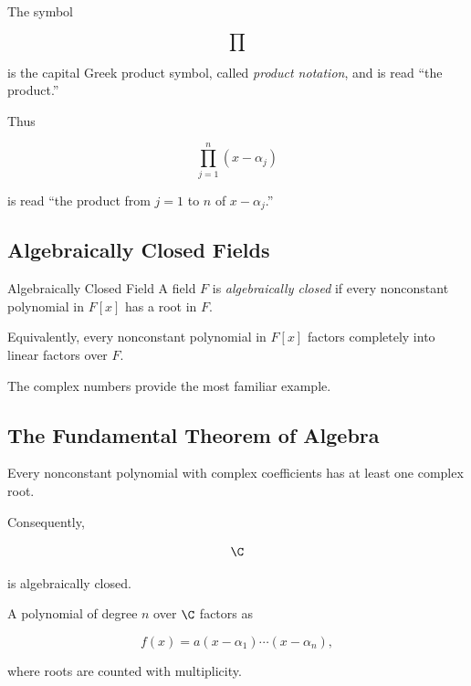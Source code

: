 The symbol

\[ \prod \]

is the capital Greek product symbol, called \emph{product notation}, and is
read ``the product.''

Thus

\[ \prod_{j=1}^{n}(x-\alpha_j) \]

is read ``the product from \(j=1\) to \(n\) of \(x-\alpha_j\).''

\subsection{Algebraically Closed Fields}
\label{subsec:algebraically-closed-fields}

\begin{definitionbox}{Algebraically Closed Field}
A field \(F\) is \emph{algebraically closed} if every nonconstant polynomial
in \(F[x]\) has a root in \(F\).
\end{definitionbox}

Equivalently, every nonconstant polynomial in \(F[x]\) factors completely
into linear factors over \(F\).

The complex numbers provide the most familiar example.

\subsection{The Fundamental Theorem of Algebra}
\label{subsec:fundamental-theorem-algebra-field}

\begin{theorem}
Every nonconstant polynomial with complex coefficients has at least one
complex root.
\end{theorem}

Consequently,

\[ \C \]

is algebraically closed.

A polynomial of degree \(n\) over \(\C\) factors as

\[ f(x)=a(x-\alpha_1)\cdots(x-\alpha_n), \]

where roots are counted with multiplicity.

